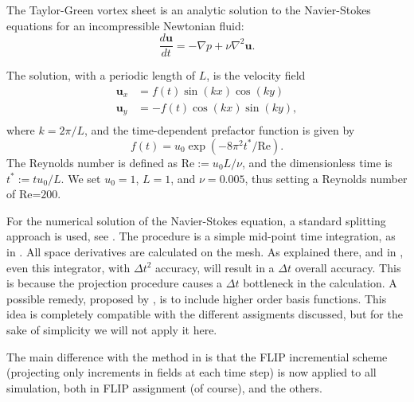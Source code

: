 \documentclass{ws-ijcm}
\begin{document}
The Taylor-Green vortex sheet is an analytic solution to the
Navier-Stokes equations for an incompressible Newtonian fluid:
\begin{equation}
  \frac{d \mathbf{u}}{d t} =  - \nabla p +  \nu \nabla^2 \mathbf{u}.
\end{equation}
%

The solution, with a periodic length of $L$, is the
velocity field
\begin{align}
\label{eq:TG_vel}
  \mathbf{u}_x &=  f(t) \sin (k x) \cos (k y) \\
  \mathbf{u}_y &= -f(t) \cos (k x) \sin (k y) ,\\
\end{align}
where $k=2\pi/L$, and the time-dependent prefactor function is given by
\[
f(t)=u_0 \exp\left( - 8 \pi^2 t^* /\mathrm{Re} \right) .
\]
The Reynolds number is defined as Re$:=u_0 L / \nu$, and the
dimensionless time is $t^* := t u_0/L$. We set $ u_0=1$, $L=1$, and
$\nu=0.005$, thus setting a Reynolds number of Re=$200$.

For the numerical solution of the Navier-Stokes equation, a standard
splitting approach is used, see \cite{codina_2001}.  The procedure is
a simple mid-point time integration, as in \cite{duque_2017b}. All
space derivatives are calculated on the mesh. As explained there, and
in \cite{Idelsohn_2015}, even this integrator, with $\Delta t^2$
accuracy, will result in a $\Delta t$ overall accuracy. This is
because the projection procedure causes a $\Delta t$ bottleneck in the
calculation. A possible remedy, proposed by \cite{duque_2017a}, is to
include higher order basis functions.  This idea is completely
compatible with the different assigments discussed, but for the sake
of simplicity we will not apply it here.

The main difference with the method in \cite{duque_2017b} is that the
FLIP incremential scheme (projecting only increments in fields at each
time step) is now applied to all simulation, both in FLIP assignment
(of course), and the others.

\end{document}
